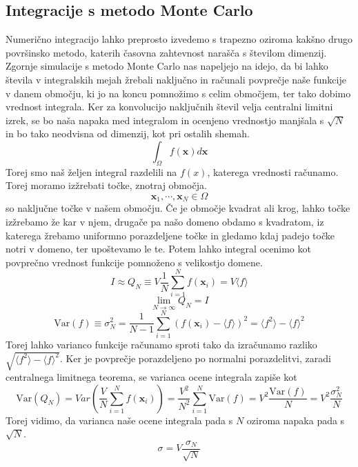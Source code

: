 \documentclass[11pt, a4paper]{article}
\begin{document}
\subsection{Integracije s metodo Monte Carlo}
Numerično integracijo lahko preprosto izvedemo s trapezno oziroma kakšno drugo površinsko metodo, katerih časovna zahtevnost narašča s številom dimenzij. Zgornje simulacije s metodo Monte Carlo nas napeljejo na idejo, da bi lahko števila v integralskih mejah žrebali naključno in računali povprečje naše funkcije  v danem območju, ki jo na koncu pomnožimo s celim območjem, ter tako dobimo vrednost integrala. Ker za konvolucijo naključnih števil velja centralni limitni izrek, se bo naša napaka med integralom in ocenjeno vrednostjo manjšala s $\sqrt{N}$ in bo tako neodvisna od dimenzij, kot pri ostalih shemah.
\begin{equation}
 \int_{\Omega} f(\mathbf{x})  d \mathbf{x}
\end{equation} 
Torej smo naš željen integral razdelili na $f(x)$, katerega vrednosti računamo. Torej moramo izžrebati točke, znotraj območja. 
\begin{equation}
{\mathbf{x}}_1, \cdots, \mathbf{x}_N\in \Omega
\end{equation}
so naključne točke v našem območju. Če je območje kvadrat ali krog, lahko točke izžrebamo že kar v njem, drugače pa našo domeno obdamo s kvadratom, iz katerega  žrebamo uniformno porazdeljene točke in gledamo kdaj padejo točke notri v domeno, ter upoštevamo le te. Potem lahko integral ocenimo kot povprečno vrednost funkcije pomnoženo s velikostjo domene.
\begin{equation}
I \approx Q_N \equiv V \frac{1}{N} \sum_{i=1}^N f(\mathbf{x}_i) = V \langle f\rangle
\end{equation}
\begin{equation}
\lim_{N \to \infty} Q_N = I
\end{equation}
\begin{equation}
\mathrm{Var}(f)\equiv\sigma_N^2 = \frac{1}{N-1} \sum_{i=1}^N \left (f(\mathbf{x}_i) - \langle f \rangle \right )^2 =  \langle f^2 \rangle  - \langle f \rangle^2
\end{equation}
Torej lahko varianco funkcije računamo sproti tako da izračunamo razliko $\sqrt{ \langle f^2 \rangle  - \langle f \rangle^2}$. Ker je povprečje porazdeljeno po normalni porazdelitvi, zaradi centralnega limitnega teorema, se varianca ocene integrala zapiše kot
\begin{equation}
\mathrm{Var}(Q_N) = Var (\frac{V}{N} \sum_{i=1}^N f(\mathbf{x}_i))= \frac{V^2}{N^2} \sum_{i=1}^N \mathrm{Var}(f) = V^2\frac{\mathrm{Var}(f)}{N} = V^2\frac{\sigma_N^2}{N}
\end{equation}
Torej vidimo, da varianca naše ocene integrala pada s $N$ oziroma
napaka pada s $\sqrt{N}$.
\begin{equation}
\sigma = V \frac{\sigma_N}{\sqrt{N}}
\end{equation}
\end{document}
